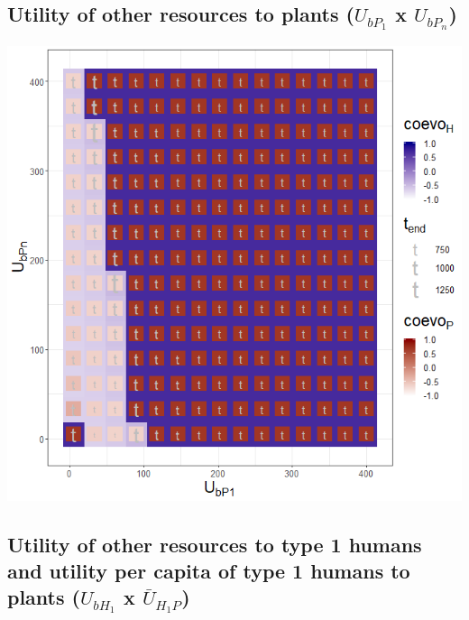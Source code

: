\documentclass[]{book}
\begin{document}
\newpage

\hypertarget{utility-of-other-resources-to-plants-u_bp_1-x-u_bp_n}{%
\subsection{\texorpdfstring{Utility of other resources to plants (\(U_{bP_{1}}\) x \(U_{bP_{n}}\))}{Utility of other resources to plants (U\_\{bP\_\{1\}\} x U\_\{bP\_\{n\}\})}}\label{utility-of-other-resources-to-plants-u_bp_1-x-u_bp_n}}


\includegraphics[width=1\linewidth]{plots/3_twoPar-U.bP1-U.bPn_plot}

\hypertarget{utility-of-other-resources-to-type-1-humans-and-utility-per-capita-of-type-1-humans-to-plants-u_bh_1-x-baru_h_1p}{%
\subsection{\texorpdfstring{Utility of other resources to type 1 humans and utility per capita of type 1 humans to plants (\(U_{bH_{1}}\) x \(\bar{U}_{H_{1}P}\))}{Utility of other resources to type 1 humans and utility per capita of type 1 humans to plants (U\_\{bH\_\{1\}\} x \textbackslash{}bar\{U\}\_\{H\_\{1\}P\})}}\label{utility-of-other-resources-to-type-1-humans-and-utility-per-capita-of-type-1-humans-to-plants-u_bh_1-x-baru_h_1p}}
\end{document}
